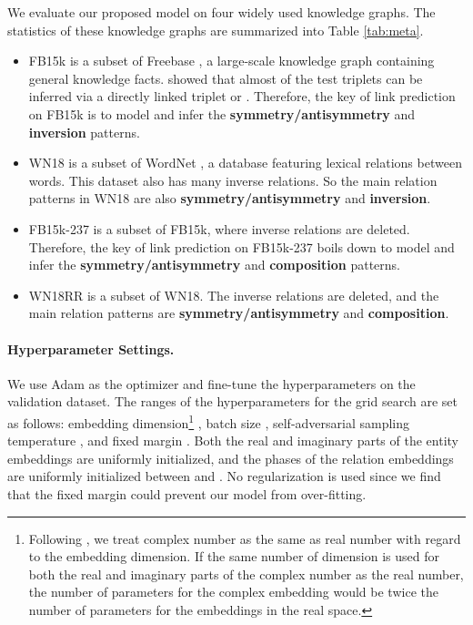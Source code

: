\documentclass{article} \usepackage{iclr2019_conference,times}
\begin{document}
We evaluate our proposed model on four widely used knowledge graphs. The statistics of these knowledge graphs are summarized into Table \ref{tab:meta}.
\begin{itemize}
\item FB15k  \citep{bordes2013translating} is a subset of Freebase  \citep{bollacker2008freebase}, a large-scale knowledge graph containing general knowledge facts. \cite{toutanova2015observed} showed that almost   of the test triplets  can be inferred via a directly linked triplet  or . Therefore, the key of link prediction on FB15k is to model and infer the \textbf{symmetry/antisymmetry} and \textbf{inversion} patterns.

\item WN18  \citep{bordes2013translating} is a subset of WordNet  \citep{miller1995wordnet}, a database featuring lexical relations between words. This dataset also has many inverse relations. So the main relation patterns in WN18 are also \textbf{symmetry/antisymmetry} and \textbf{inversion}.

\item FB15k-237  \citep{toutanova2015observed} is a subset of FB15k, where inverse relations are deleted. Therefore, the key of link prediction on FB15k-237 boils down to model and infer the \textbf{symmetry/antisymmetry} and \textbf{composition} patterns.

\item WN18RR  \citep{dettmers2017convolutional} is a subset of WN18. The inverse relations are deleted, and the main relation patterns are \textbf{symmetry/antisymmetry} and \textbf{composition}.
\end{itemize}



\paragraph{Hyperparameter Settings.} We use Adam  \citep{kingma2014adam} as the optimizer and fine-tune the hyperparameters on the validation dataset. The ranges of the hyperparameters for the grid search are set as follows: embedding dimension\footnote{Following \cite{trouillon2016complex}, we treat complex number as the same as real number with regard to the embedding dimension. If the same number of dimension is used for both the real and imaginary parts of the complex number as the real number, the number of parameters for the complex embedding would be twice the number of parameters for the embeddings in the real space.} , batch size , self-adversarial sampling temperature , and fixed margin . Both the real and imaginary parts of the entity embeddings are uniformly initialized, and the phases of the relation embeddings are uniformly initialized between  and . No regularization is used since we find that the fixed margin  could prevent our model from over-fitting. 
\end{document}
